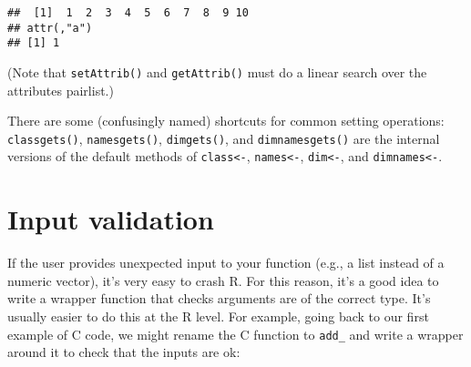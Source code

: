 \begin{Shaded}
\begin{Highlighting}[]
\StringTok{ }\NormalTok{(}\NormalTok{(} \NormalTok{, } \NormalTok{, } \NormalTok{), }

\NormalTok{)}
\StringTok{ }\OperatorTok{:}
\NormalTok{, }\NormalTok{)}
\end{Highlighting}
\end{Shaded}

\begin{verbatim}
##  [1]  1  2  3  4  5  6  7  8  9 10
## attr(,"a")
## [1] 1
\end{verbatim}

(Note that \texttt{setAttrib()} and \texttt{getAttrib()} must do a
linear search over the attributes pairlist.)

There are some (confusingly named) shortcuts for common setting
operations: \texttt{classgets()}, \texttt{namesgets()},
\texttt{dimgets()}, and \texttt{dimnamesgets()} are the internal
versions of the default methods of \texttt{class\textless{}-},
\texttt{names\textless{}-}, \texttt{dim\textless{}-}, and
\texttt{dimnames\textless{}-}.

\hypertarget{c-input-validation}{%
\section{Input validation}\label{c-input-validation}}

If the user provides unexpected input to your function (e.g., a list
instead of a numeric vector), it's very easy to crash R. For this
reason, it's a good idea to write a wrapper function that checks
arguments are of the correct type. It's usually easier to do this at the
R level. For example, going back to our first example of C code, we
might rename the C function to \texttt{add\_} and write a wrapper around
it to check that the inputs are ok:

